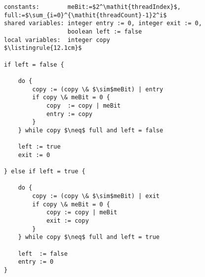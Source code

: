 \begin{center}
\begin{minipage}{\textwidth}
\begin{lstlisting}[mathescape, linewidth=12.1cm]
constants:        meBit:=$2^\mathit{threadIndex}$, full:=$\sum_{i=0}^{\mathit{threadCount}-1}2^i$
shared variables: integer entry := 0, integer exit := 0,
                  boolean left := false
local variables:  integer copy
$\listingrule{12.1cm}$

if left = false {

	do {
		copy := (copy \& $\sim$meBit) | entry
		if copy \& meBit = 0 {
			copy  := copy | meBit
			entry := copy
		}
	} while copy $\neq$ full and left = false

	left := true
	exit := 0

} else if left = true {

	do {
		copy := (copy \& $\sim$meBit) | exit
		if copy \& meBit = 0 {
			copy := copy | meBit
			exit := copy
		}
	} while copy $\neq$ full and left = true

	left  := false
	entry := 0
}
\end{lstlisting}
\end{minipage}
\end{center}
